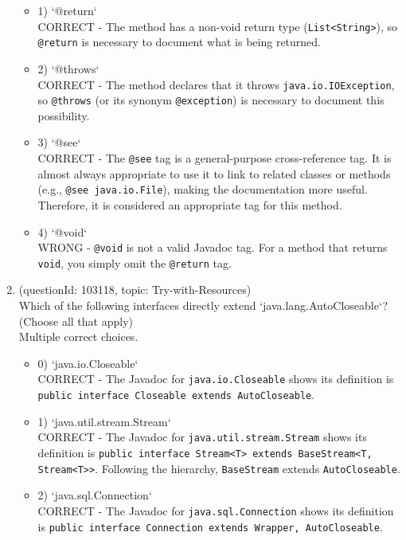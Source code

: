\documentclass[12pt]{article}
\begin{document}
\begin{enumerate}[label=(\arabic*)]
\begin{itemize}
\item 1) `@return`
 \\ 
CORRECT - The method has a non-void return type (\verb|List<String>|), so \verb|@return| is necessary to document what is being returned.

\item 2) `@throws`
 \\ 
CORRECT - The method declares that it throws \verb|java.io.IOException|, so \verb|@throws| (or its synonym \verb|@exception|) is necessary to document this possibility.

\item 3) `@see`
 \\ 
CORRECT - The \verb|@see| tag is a general-purpose cross-reference tag. It is almost always appropriate to use it to link to related classes or methods (e.g., \verb|@see java.io.File|), making the documentation more useful. Therefore, it is considered an appropriate tag for this method.

\item 4) `@void`
 \\ 
WRONG - \verb|@void| is not a valid Javadoc tag. For a method that returns \verb|void|, you simply omit the \verb|@return| tag.

\end{itemize}
\item (questionId: 103118, topic: Try-with-Resources) \\ 
Which of the following interfaces directly extend `java.lang.AutoCloseable`? (Choose all that apply)
\\ \noindent Multiple correct choices. 
\begin{itemize}
\item 0) `java.io.Closeable`
 \\ 
CORRECT - The Javadoc for \verb|java.io.Closeable| shows its definition is \verb|public interface Closeable extends AutoCloseable|.

\item 1) `java.util.stream.Stream`
 \\ 
CORRECT - The Javadoc for \verb|java.util.stream.Stream| shows its definition is \verb|public interface Stream<T> extends BaseStream<T, Stream<T>>|. Following the hierarchy, \verb|BaseStream| extends \verb|AutoCloseable|.

\item 2) `java.sql.Connection`
 \\ 
CORRECT - The Javadoc for \verb|java.sql.Connection| shows its definition is \verb|public interface Connection extends Wrapper, AutoCloseable|.


\end{itemize}
\end{enumerate}
\end{document}
